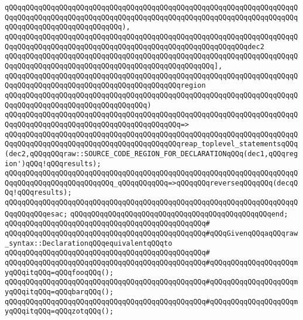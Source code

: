 \verb|qQQqqQQqqQQqqQQqqQQqqQQqqQQqqQQqqQQqqQQqqQQqqQQqqQQqqQQqqQQqqQQqqQQqqQQqqQQqqQQqqQQqqQQqqQQqqQQqqQQqqQQqqQQqqQQqqQQqqQQqqQQqqQQqqQQqqQQqqQQqqQQqqQQqqQQqqQQqqQQqqQQqqQQq),|\newline
\verb|qQQqqQQqqQQqqQQqqQQqqQQqqQQqqQQqqQQqqQQqqQQqqQQqqQQqqQQqqQQqqQQqqQQqqQQqqQQqqQQqqQQqqQQqqQQqqQQqqQQqqQQqqQQqqQQqqQQqqQQqqQQqqQQqdec2|\newline
\verb|qQQqqQQqqQQqqQQqqQQqqQQqqQQqqQQqqQQqqQQqqQQqqQQqqQQqqQQqqQQqqQQqqQQqqQQqqQQqqQQqqQQqqQQqqQQqqQQqqQQqqQQqqQQqqQQqqQQqqQQq],|\newline
\verb|qQQqqQQqqQQqqQQqqQQqqQQqqQQqqQQqqQQqqQQqqQQqqQQqqQQqqQQqqQQqqQQqqQQqqQQqqQQqqQQqqQQqqQQqqQQqqQQqqQQqqQQqqQQqqQQqregion|\newline
\verb|qQQqqQQqqQQqqQQqqQQqqQQqqQQqqQQqqQQqqQQqqQQqqQQqqQQqqQQqqQQqqQQqqQQqqQQqqQQqqQQqqQQqqQQqqQQqqQQqqQQqqQQq)|\newline
\verb|qQQqqQQqqQQqqQQqqQQqqQQqqQQqqQQqqQQqqQQqqQQqqQQqqQQqqQQqqQQqqQQqqQQqqQQqqQQqqQQqqQQqqQQqqQQqqQQqqQQqqQQqqQQqqQQq=>|\newline
\verb|qQQqqQQqqQQqqQQqqQQqqQQqqQQqqQQqqQQqqQQqqQQqqQQqqQQqqQQqqQQqqQQqqQQqqQQqqQQqqQQqqQQqqQQqqQQqqQQqqQQqqQQqqQQqqQQqreap_toplevel_statementsqQQq(dec2,qQQqqQQqraw::SOURCE_CODE_REGION_FOR_DECLARATIONqQQq(dec1,qQQqregion')qQQq!qQQqresults);|\newline
\newline
\verb|qQQqqQQqqQQqqQQqqQQqqQQqqQQqqQQqqQQqqQQqqQQqqQQqqQQqqQQqqQQqqQQqqQQqqQQqqQQqqQQqqQQqqQQqqQQqqQQq_qQQqqQQqqQQq=>qQQqqQQqreverseqQQqqQQq(decqQQq!qQQqresults);|\newline
\verb|qQQqqQQqqQQqqQQqqQQqqQQqqQQqqQQqqQQqqQQqqQQqqQQqqQQqqQQqqQQqqQQqqQQqqQQqqQQqqQQqesac;|\newline
\verb|qQQqqQQqqQQqqQQqqQQqqQQqqQQqqQQqqQQqqQQqqQQqqQQqend;|\newline
\verb|qQQqqQQqqQQqqQQqqQQqqQQqqQQqqQQqqQQqqQQqqQQqqQQq#|\newline
\verb|qQQqqQQqqQQqqQQqqQQqqQQqqQQqqQQqqQQqqQQqqQQqqQQq#qQQqGivenqQQqaqQQqraw_syntax::DeclarationqQQqequivalentqQQqto|\newline
\verb|qQQqqQQqqQQqqQQqqQQqqQQqqQQqqQQqqQQqqQQqqQQqqQQq#|\newline
\verb|qQQqqQQqqQQqqQQqqQQqqQQqqQQqqQQqqQQqqQQqqQQqqQQq#qQQqqQQqqQQqqQQqqQQqmyqQQqitqQQq=qQQqfooqQQq();|\newline
\verb|qQQqqQQqqQQqqQQqqQQqqQQqqQQqqQQqqQQqqQQqqQQqqQQq#qQQqqQQqqQQqqQQqqQQqmyqQQqitqQQq=qQQqbarqQQq();|\newline
\verb|qQQqqQQqqQQqqQQqqQQqqQQqqQQqqQQqqQQqqQQqqQQqqQQq#qQQqqQQqqQQqqQQqqQQqmyqQQqitqQQq=qQQqzotqQQq();|\newline
